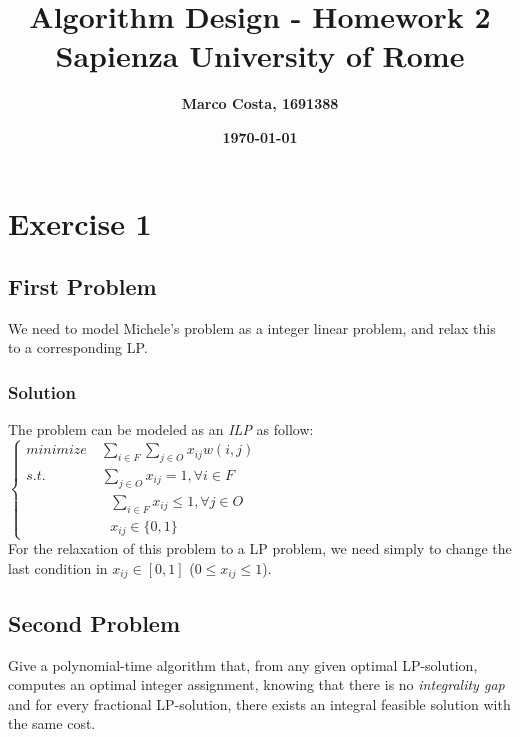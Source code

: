 \documentclass[11pt]{article}
\title{\textbf{Algorithm Design - Homework 2} \\ \bigskip \large \textbf{Sapienza University of Rome}}
\date{\textbf{\today}}
\author{\textbf{Marco Costa, 1691388}}
\begin{document}
\maketitle
\newpage

\section*{Exercise 1}
\subsection*{First Problem}
We need to model Michele's problem as a integer linear problem, and relax this to a corresponding LP.
\subsubsection*{Solution}
The problem can be modeled as an \textit{ILP} as follow: \\
\(\left \{ \begin{array}{l}
minimize \quad \sum\limits_{i \in F} \sum\limits_{j \in O}x_{ij}w(i,j)\\
s.t. \qquad \qquad \sum\limits_{j \in O}x_{ij} = 1 , \forall{i \in F}\\
\qquad \qquad \qquad \sum\limits_{i \in F}x_{ij} \leq 1 , \forall{j \in O}\\
\qquad \qquad \qquad x_{ij} \in{\{0,1\}}
\end{array}
\right. \)\\
For the relaxation of this problem to a LP problem, we need simply to change the last condition in $x_{ij} \in [0, 1]$ ($0 \leq x_{ij} \leq 1$).
\subsection*{Second Problem}
Give a polynomial-time algorithm that, from any
given optimal LP-solution, computes an optimal integer assignment, knowing that there is no \textit{integrality gap} and for every fractional LP-solution, there exists an integral
feasible solution with the same cost.
\end{document}
